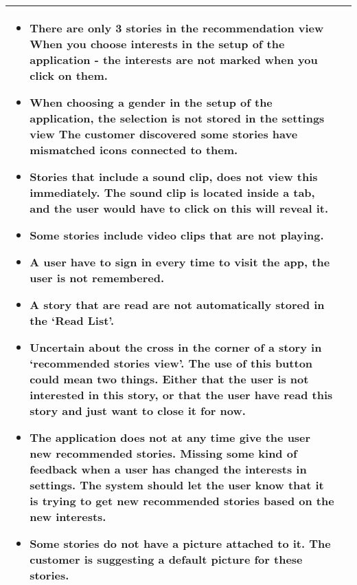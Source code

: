 {\begin{center}
\begin{longtable}{ | p{4cm} | p{13cm} | }
\begin{itemize}[noitemsep]
		 \item There are only 3 stories in the recommendation view 
		 When you choose interests in the setup of the application - the interests are not marked when you click on them. \newline
		 \item When choosing a gender in the setup of the application, the selection is not stored in the settings view
		 The customer discovered some stories have mismatched icons connected to them. \newline
		 \item Stories that include a sound clip, does not view this immediately. The sound clip is located inside a tab, and the user would have to click on this will reveal it. \newline
		\item  Some stories include video clips that are not playing.  \newline
		\item  A user have to sign in every time to visit the app, the user is not remembered. \newline
		\item  A story that are read are not automatically stored in the ‘Read List’. \newline
		\item  Uncertain about the cross in the corner of a story in ‘recommended stories view’. The use of this button could mean two things. Either that the user is not interested in this story, or that the user have read this story and just want to close it for now. \newline
		\item  The application does not at any time give the user new recommended stories. \newline
		 Missing some kind of feedback when a user has changed the interests in settings. The system should let the user know that it is trying to get new recommended stories based on the new interests. \newline
		 \item Some stories do not have a picture attached to it. The customer is suggesting a default picture for these stories.
		 \end{itemize}
		 \\ \hline 
		 

		
	\end{longtable}
\end{center}

}

